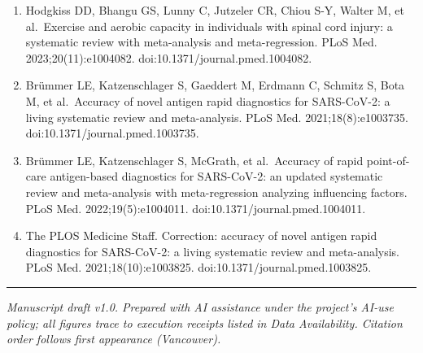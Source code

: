 \documentclass[
]{article}
\begin{document}
\begin{enumerate}
  Cohen J. A coefficient of agreement for nominal scales. Educ Psychol
  Meas. 1960;20(1):37-46. doi:10.1177/001316446002000104.
\item
  Hodgkiss DD, Bhangu GS, Lunny C, Jutzeler CR, Chiou S-Y, Walter M, et
  al.~Exercise and aerobic capacity in individuals with spinal cord
  injury: a systematic review with meta-analysis and meta-regression.
  PLoS Med. 2023;20(11):e1004082. doi:10.1371/journal.pmed.1004082.
\item
  Brümmer LE, Katzenschlager S, Gaeddert M, Erdmann C, Schmitz S, Bota
  M, et al.~Accuracy of novel antigen rapid diagnostics for SARS-CoV-2:
  a living systematic review and meta-analysis. PLoS Med.
  2021;18(8):e1003735. doi:10.1371/journal.pmed.1003735.
\item
  Brümmer LE, Katzenschlager S, McGrath, et al.~Accuracy of rapid
  point-of-care antigen-based diagnostics for SARS-CoV-2: an updated
  systematic review and meta-analysis with meta-regression analyzing
  influencing factors. PLoS Med. 2022;19(5):e1004011.
  doi:10.1371/journal.pmed.1004011.
\item
  The PLOS Medicine Staff. Correction: accuracy of novel antigen rapid
  diagnostics for SARS-CoV-2: a living systematic review and
  meta-analysis. PLoS Med. 2021;18(10):e1003825.
  doi:10.1371/journal.pmed.1003825.
\end{enumerate}

\begin{center}\rule{0.5\linewidth}{0.5pt}\end{center}

\emph{Manuscript draft v1.0. Prepared with AI assistance under the
project's AI-use policy; all figures trace to execution receipts listed
in Data Availability. Citation order follows first appearance
(Vancouver).}
\end{document}
